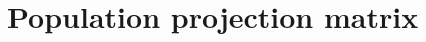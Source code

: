 \documentclass[11pt]{article}
\begin{document}


\newpage{}




%
%
%
%
%
\renewcommand\thesection{Appendix~\Alph{section}}
\renewcommand\thesubsection{\Alph{section}.\arabic{subsection}}


\section{Population projection matrix}\label{App:Projection}
\renewcommand{\theequation}{A\arabic{equation}}
\setcounter{equation}{0}  %
\setcounter{table}{0}  %
\end{document}
